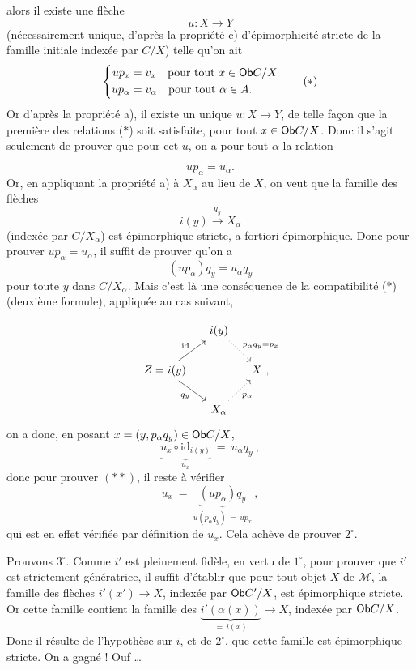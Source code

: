 alors il existe une flèche
\[ u : X \longrightarrow Y \]
(nécessairement unique, d'après la propriété c) d'épimorphicité stricte de la famille initiale indexée par $C/X$) telle qu'on ait
\[ \left\{\begin{aligned}
up_x &= v_x \quad \text{pour tout } x \in \Ob C/X\\ %
up_\alpha &= v_\alpha \quad \text{pour tout } \alpha \in A. %
\end{aligned}\right. \tag*{($*$)} \]
Or d'après la propriété a), il existe un unique $u : X \longrightarrow Y$, de telle façon que la première des relations ($*$) soit satisfaite, pour tout $x \in \mathsf{Ob} C/X$. Donc il s'agit seulement de prouver que pour cet $u$, on a pour tout $\alpha$ la relation

\[ up_\alpha = u_\alpha . \]
Or, en appliquant la propriété a) à $X_\alpha$ au lieu de $X$, on veut que la famille des flèches %
\[ i(y) \xrightarrow{q_y} X_\alpha \]
(indexée par $C/X_\alpha$) est épimorphique stricte, a fortiori épimorphique. Donc pour prouver $up_\alpha = u_\alpha$, il suffit de prouver qu'on a
\[ (up_\alpha)q_y = u_\alpha q_y \tag*{($**$)} \]
pour toute $y$ dans $C/X_\alpha$. Mais c'est là une conséquence de la compatibilité ($*$) (deuxième formule), appliquée au cas suivant,


\[
\begin{tikzcd}[column sep=small]
 & i(y) \arrow[dr, dotted, "p_\alpha q_y=p_x"] & \\
Z=i(y) \arrow[ur, "\mathrm{id}"] \arrow[dr, "q_y"'] & & X \ , \\
 & X_\alpha \arrow[ur, dotted, "p_\alpha"'] &
\end{tikzcd}
\]
on a donc, en posant $x=(y,p_\alpha q_y)\in\mathsf{Ob} C/X$,
\[
\underbrace{u_x\circ\mathrm{id}_{i(y)}}_{u_x} \ = \ u_\alpha q_y \ ,
\]
donc pour prouver $(**)$, il reste à vérifier
\[
u_x \ = \ \underbrace{(up_\alpha)q_y}_{u(p_\alpha q_y)\,=\,up_x} \ ,
\]
qui est en effet vérifiée par définition de $u_x$. Cela achève de prouver $2^\circ$.

Prouvons $3^\circ$. Comme $i'$ est pleinement fidèle, en vertu de $1^\circ$, pour prouver que $i'$ est strictement génératrice, il suffit d'établir que pour tout objet $X$ de $\mathcal{M}$, la famille des flèches $i'(x')\longrightarrow X$, indexée par $\mathsf{Ob} C'/X$, est épimorphique stricte. Or cette famille contient la famille des $\underbrace{i'(\alpha(x))}_{=\,i(x)}\longrightarrow X$, indexée par $\mathsf{Ob} C/X$. Donc il résulte de l'hypothèse sur $i$, et de $2^\circ$, que cette famille est épimorphique stricte. On a gagné ! Ouf \dots

